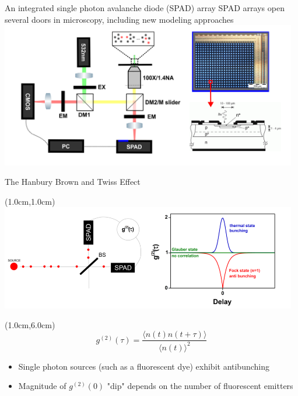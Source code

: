 \documentclass{beamer}					%
\begin{document}
\begin{frame}{An integrated single photon avalanche diode (SPAD) array}
SPAD arrays open several doors in microscopy, including new modeling approaches
\includegraphics[width=13cm]{../../spad/spad/media/SPADD.png}
\end{frame}


\begin{frame}{The Hanbury Brown and Twiss Effect}
\begin{textblock*}{13cm}(1.0cm,1.0cm)
\includegraphics[width=13cm]{../../spad/spad/media/HBT.png}
\end{textblock*}

\begin{textblock*}{13cm}(1.0cm,6.0cm)
\begin{equation*}
g^{(2)}(\tau) = \frac{\langle n(t) n(t+\tau) \rangle}{\langle n(t) \rangle^2}
\end{equation*}

\begin{itemize}
\item Single photon sources (such as a fluorescent dye) exhibit antibunching
\item Magnitude of $g^{(2)}(0)$ "dip" depends on the number of fluorescent emitters
\end{itemize}
\end{textblock*}

\end{frame}
\end{document}
